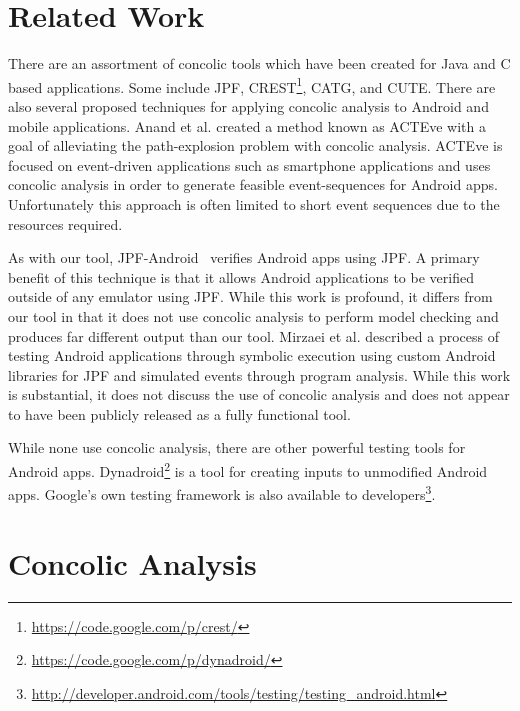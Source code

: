 \documentclass{sig-alternate}
\begin{document}
\section{Related Work}
\label{sec: relatedwork}

There are an assortment of concolic tools which have been created for Java and C based applications. Some include JPF, CREST\footnote{\url{https://code.google.com/p/crest/}}, CATG, and CUTE\cite{Sen:2005:CCU:1081706.1081750}. There are also several proposed techniques for applying concolic analysis to Android and mobile applications. Anand et al.\cite{Anand:2012:ACT:2393596.2393666} created a method known as ACTEve with a goal of alleviating the path-explosion problem with concolic analysis. ACTEve is focused on event-driven applications such as smartphone applications and uses concolic analysis in order to generate feasible event-sequences for Android apps. Unfortunately this approach is often limited to short event sequences due to the resources required.  

As with our tool, JPF-Android~\cite{vanderMerwe:2014:EPS:2557833.2560576} verifies Android apps using JPF. A primary benefit of this technique is that it allows Android applications to be verified outside of any emulator using JPF. While this work is profound, it differs from our tool in that it does not use concolic analysis to perform model checking and produces far different output than our tool. Mirzaei et al.\cite{Mirzaei:2012:TAA:2382756.2382798} described a process of testing Android applications through symbolic execution using custom Android libraries for JPF and simulated events through program analysis. While this work is substantial, it does not discuss the use of concolic analysis and does not appear to have been publicly released as a fully functional tool.

While none use concolic analysis, there are other powerful testing tools for Android apps. Dynadroid\footnote{\url{https://code.google.com/p/dynadroid/}} is a tool for creating inputs to unmodified Android apps.  Google's own testing framework is also available to developers\footnote{\url{http://developer.android.com/tools/testing/testing_android.html}}.



\section{Concolic Analysis}
\label{sec: concolicanalysis}
\end{document}
